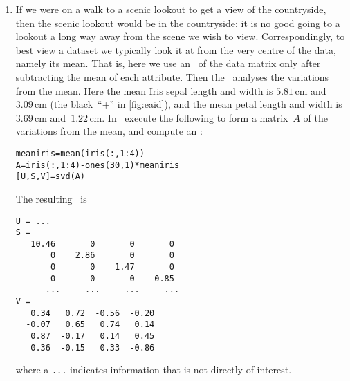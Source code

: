 \begin{example}
\begin{solution}
\begin{enumerate}
\item If we were on a walk to a scenic lookout to get a view of the countryside, then the scenic lookout would be in the countryside: it is no good going to a lookout a long way away from the scene we wish to view.
Correspondingly, to best view a dataset we typically look it at from the very centre of the data, namely its mean.
That is, here we use an \svd\ of the data matrix only after subtracting the mean of each attribute.
Then the \svd\ analyses the variations from the mean.
Here the mean Iris sepal length and width is \(5.81\)\,cm and~\(3.09\)\,cm (the black~``+'' in \autoref{fig:eaid}), and the mean petal length and width is \(3.69\)\,cm and~\(1.22\)\,cm.
In \script\ execute the following to form a matrix~\(A\) of the variations from the mean, and compute an \svd:
\begin{verbatim}
meaniris=mean(iris(:,1:4))
A=iris(:,1:4)-ones(30,1)*meaniris
[U,S,V]=svd(A)
\end{verbatim}
\setbox\ajrqrbox\hbox{}%
\marginpar{\usebox{\ajrqrbox\\[2ex]}}%
The resulting \svd\ is \twodp
\begin{verbatim}
U = ...
S =
   10.46       0       0       0
       0    2.86       0       0
       0       0    1.47       0
       0       0       0    0.85
      ...     ...     ...     ...
V =
   0.34   0.72  -0.56  -0.20
  -0.07   0.65   0.74   0.14
   0.87  -0.17   0.14   0.45
   0.36  -0.15   0.33  -0.86
\end{verbatim}
where a \verb|...| indicates information that is not directly of interest.


\end{enumerate}
\end{solution}
\end{example}
